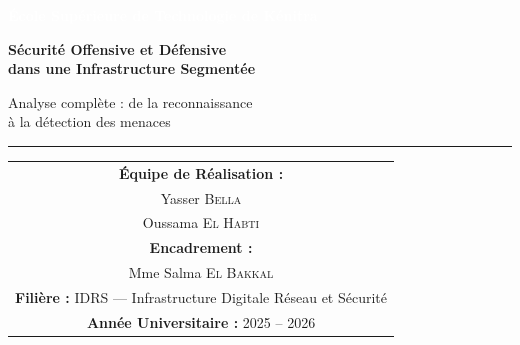 \documentclass[12pt,a4paper,openany]{report}
\begin{document}
	\sloppy
	
	\begin{titlepage}
		\thispagestyle{empty}
		
		\noindent
		\colorbox{primary}{%
			\parbox{\dimexpr\textwidth-2\fboxsep}{%
				\vspace{0.8cm}
				\centering
				{\large\bfseries\textcolor{white}{École Supérieure de Technologie de Kénitra }}\\[0.8cm]
			}%
		}
		
		\vspace{2cm}
		\centering
		
		{\Huge\bfseries\color{primary}
			Sécurité Offensive et Défensive\\[0.4cm]
			dans une Infrastructure Segmentée\\[0.6cm]
		}
		
		{\Large\color{secondary}
			Analyse complète : de la reconnaissance\\
			à la détection des menaces\par
		}
		
		\vspace{0.8cm}
		{\color{accent}\rule{10cm}{1.5pt}\par}
		
		\vspace{2cm}
		
		{\large
			\renewcommand{\arraystretch}{1.5}
			\begin{tabular}{c}
				\textbf{\color{primary}Équipe de Réalisation :}\\[0.3cm]
				Yasser \textsc{Bella} \\
				Oussama \textsc{El Habti} \\[0.6cm]
				
				\textbf{\color{primary}Encadrement :}\\[0.3cm]
				Mme Salma \textsc{El Bakkal}\\[0.6cm]
				
				\textbf{\color{primary}Filière :} IDRS --- Infrastructure Digitale Réseau et Sécurité \\[0.3cm]
				\textbf{\color{primary}Année Universitaire :} 2025 -- 2026 \\
			\end{tabular}
		}
		
	\end{titlepage}
	
\end{document}
